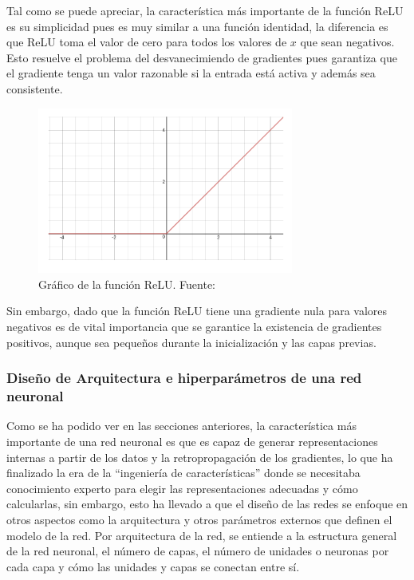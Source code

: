            Tal como se puede apreciar, la característica más importante de la función ReLU es su simplicidad pues es muy 
            similar a una función identidad, la diferencia es que ReLU toma el valor de cero para todos los valores de $x$ que 
            sean negativos. Esto resuelve el problema del desvanecimiendo de gradientes pues garantiza que el gradiente 
            tenga un valor razonable si la entrada está activa y además sea consistente.

            \begin{figure}[!h] 
                \centering
                \includegraphics[width=0.75\textwidth]{img/relu}
                \caption[Gráfico de la función ReLU]{Gráfico de la función ReLU. Fuente: \cite{wang_2016} }
                \label{fig:relu}
            \end{figure}

            Sin embargo, dado que la función ReLU tiene una gradiente nula para valores negativos es de vital importancia 
            que se garantice la existencia de gradientes positivos, aunque sea pequeños durante la inicialización y las capas 
            previas.

        \subsubsection{Diseño de Arquitectura e hiperparámetros de una red neuronal}
        Como se ha podido ver en las secciones anteriores, la característica más importante de una red neuronal es que es capaz
        de generar representaciones internas a partir de los datos y la retropropagación de los gradientes, lo que ha finalizado la era 
        de la ``ingeniería de características'' donde se necesitaba conocimiento experto para elegir las representaciones adecuadas y cómo calcularlas, sin embargo, esto 
        ha llevado a que el diseño de las redes se enfoque en otros aspectos como la arquitectura y otros parámetros externos 
        que definen el modelo de la red. Por arquitectura de la red, se entiende a la estructura general de la red neuronal, 
        el número de capas, el número de unidades o neuronas por cada capa y cómo las unidades y capas se conectan entre sí.

